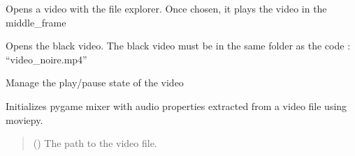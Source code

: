 \documentclass[letterpaper,10pt,english]{sphinxmanual}
\begin{document}
\begin{fulllineitems}

\begin{fulllineitems}
\label{\detokenize{general_interface:general_interface.LecteurVideo.ouvrir_video}}
\pysigstartsignatures
{}
\pysigstopsignatures
\sphinxAtStartPar
Opens a video with the file explorer.
Once chosen, it plays the video in the middle\_frame

\end{fulllineitems}


\begin{fulllineitems}
\label{\detokenize{general_interface:general_interface.LecteurVideo.ouvrir_video_noire}}
\pysigstartsignatures
{}
\pysigstopsignatures
\sphinxAtStartPar
Opens the black video.
The black video must be in the same folder as the code : “video\_noire.mp4”

\end{fulllineitems}


\begin{fulllineitems}
\label{\detokenize{general_interface:general_interface.LecteurVideo.pause_lecture}}
\pysigstartsignatures
{}
\pysigstopsignatures
\sphinxAtStartPar
Manage the play/pause state of the video

\end{fulllineitems}


\begin{fulllineitems}
\label{\detokenize{general_interface:general_interface.LecteurVideo.preparer_mixer}}
\pysigstartsignatures
{}
\pysigstopsignatures
\sphinxAtStartPar
Initializes pygame mixer with audio properties extracted from a video file using moviepy.
\begin{quote}\begin{description}
\sphinxAtStartPar
{} () \textendash{} The path to the video file.


\end{description}
\end{quote}
\end{fulllineitems}
\end{fulllineitems}
\end{document}
